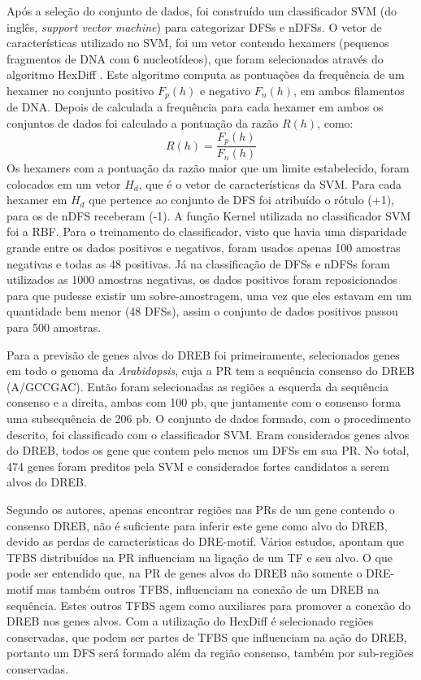 Após a seleção do conjunto de dados, foi construído um classificador SVM (do inglês, \textit{support vector machine}) para categorizar DFSs e nDFSs. O vetor de características utilizado no SVM, foi um vetor contendo hexamers (pequenos fragmentos de DNA com 6 nucleotídeos), que foram selecionados através do algoritmo HexDiff \cite{Chan2005}. Este algoritmo computa as pontuações da frequência de um hexamer no conjunto positivo $F_{p}(h)$ e negativo $F_{n}(h)$, em ambos filamentos de DNA. Depois de calculada a frequência para cada hexamer em ambos os conjuntos de dados foi calculado a pontuação da razão $R(h)$, como:
\begin{equation}
R(h) = \frac{F_{p}(h)}{F_{n}(h)}
\end{equation}
Os hexamers com a pontuação da razão maior que um limite estabelecido, foram colocados em um vetor $H_{d}$, que é o vetor de características da SVM. Para cada hexamer em $H_{d}$ que pertence ao conjunto de DFS foi atribuído o rótulo (+1), para os de nDFS receberam (-1). A função Kernel utilizada no classificador SVM foi a RBF. Para o treinamento do classificador, visto que havia uma disparidade grande entre os dados positivos e negativos, foram usados apenas 100 amostras negativas e todas as 48 positivas. Já na classificação de DFSs e nDFSs foram utilizados as 1000 amostras negativas, os dados positivos foram reposicionados para que pudesse existir um sobre-amostragem, uma vez que eles estavam em um quantidade bem menor (48 DFSs), assim o conjunto de dados positivos passou para 500 amostras.

Para a previsão de genes alvos do DREB foi primeiramente, selecionados genes em todo o genoma da \textit{Arabidopsis}, cuja a PR tem a sequência consenso do DREB (A/GCCGAC). Então foram selecionadas as regiões a esquerda da sequência consenso e a direita, ambas com 100 pb, que juntamente com o consenso forma uma subsequência de 206 pb. O conjunto de dados formado, com o procedimento descrito, foi classificado com o classificador SVM. Eram considerados genes alvos do DREB, todos os gene que contem  pelo menos um DFSs em sua PR. No total, 474 genes foram preditos pela SVM e considerados fortes candidatos a serem alvos do DREB.

Segundo os autores, apenas encontrar regiões nas PRs de um gene contendo o consenso DREB, não é suficiente para inferir este gene como alvo do DREB, devido as perdas de características do DRE-motif. Vários estudos, apontam que TFBS distribuídos na PR influenciam na ligação de um TF e seu alvo. O que pode ser entendido que, na PR de genes alvos do DREB não somente o DRE-motif mas também outros TFBS, influenciam na conexão de um DREB na sequência. Estes outros TFBS agem como auxiliares para promover a conexão do DREB nos genes alvos. Com a utilização do HexDiff é selecionado regiões conservadas, que podem ser partes de TFBS que influenciam na ação do DREB, portanto um DFS será formado além da região consenso, também por sub-regiões conservadas.

